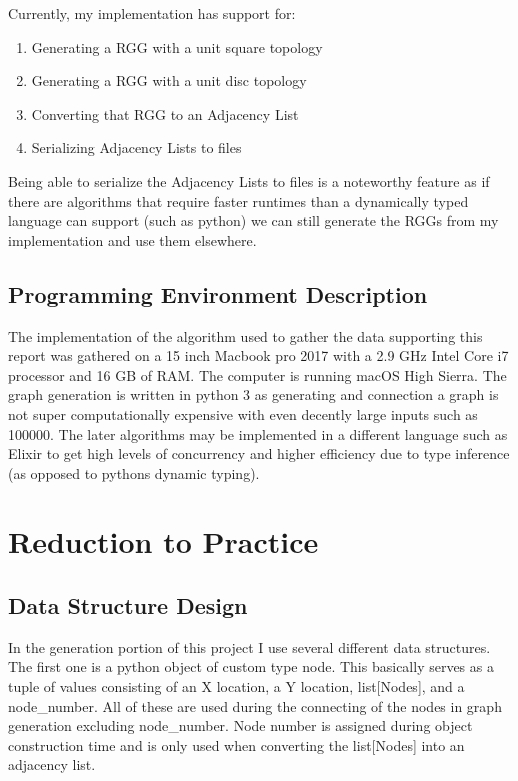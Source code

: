 \documentclass{article}
\begin{document}
  Currently, my implementation has support for:
  \begin{enumerate}
    \item Generating a RGG with a unit square topology
    \item Generating a RGG with a unit disc topology
    \item Converting that RGG to an Adjacency List
    \item Serializing Adjacency Lists to files
  \end{enumerate}
  Being able to serialize the Adjacency Lists to files is a noteworthy feature as if there are algorithms that require faster runtimes than a dynamically typed language can support (such as python) we can still generate the RGGs from my implementation and use them elsewhere.

  \subsection{Programming Environment Description}
  	The implementation of the algorithm used to gather the data supporting this report was gathered on a 15 inch Macbook pro 2017 with a 2.9 GHz Intel Core i7 processor and 16 GB of RAM.
    The computer is running macOS High Sierra.
    The graph generation is written in python 3 as generating and connection a graph is not super computationally expensive with even decently large inputs such as 100000.
    The later algorithms may be implemented in a different language such as Elixir to get high levels of concurrency and higher efficiency due to type inference (as opposed to pythons dynamic typing).
  \section{Reduction to Practice}
	  \subsection{Data Structure Design}
    In the generation portion of this project I use several different data structures.
    The first one is a python object of custom type node.
    This basically serves as a tuple of values consisting of an X location, a Y location, list[Nodes], and a node_number.
    All of these are used during the connecting of the nodes in graph generation excluding node_number.
    Node number is assigned during object construction time and is only used when converting the list[Nodes] into an adjacency list.
\end{document}
